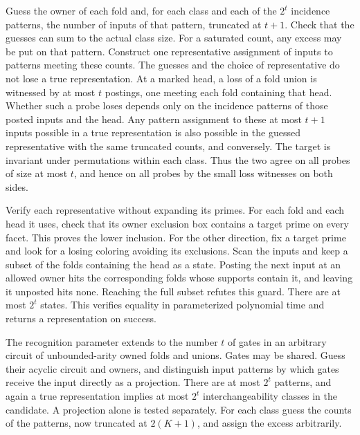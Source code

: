 Guess the owner of each fold and, for each class and each
of the $2^t$ incidence patterns, the number of inputs of
that pattern, truncated at $t+1$. Check that the guesses
can sum to the actual class size. For a saturated count,
any excess may be put on that pattern. Construct one
representative assignment of inputs to patterns meeting
these counts. The guesses and the choice of representative
do not lose a true representation. At a marked head, a
loss of a fold union is witnessed by at most $t$ postings,
one meeting each fold containing that head. Whether such a
probe loses depends only on the incidence patterns of those
posted inputs and the head. Any pattern assignment to
these at most $t+1$ inputs possible in a true representation
is also possible in the guessed representative with the
same truncated counts, and conversely. The target is
invariant under permutations within each class. Thus the
two agree on all probes of size at most $t$, and hence on
all probes by the small loss witnesses on both sides.

Verify each representative without expanding its primes.
For each fold and each head it uses, check that its
owner exclusion box contains a target prime on every
facet. This proves the lower inclusion. For the other
direction, fix a target prime and look for a losing
coloring avoiding its exclusions. Scan the inputs and
keep a subset of the folds containing the head as a
state. Posting the next input at an allowed owner hits
the corresponding folds whose supports contain it, and
leaving it unposted hits none. Reaching the full subset
refutes this guard. There are at most $2^t$ states.
This verifies equality in parameterized polynomial time
and returns a representation on success.

The recognition parameter extends to the number $t$ of
gates in an arbitrary circuit of unbounded-arity owned folds
and unions. Gates may be shared. Guess their acyclic circuit
and owners, and distinguish input patterns by which gates
receive the input directly as a projection. There are at most
$2^t$ patterns, and again a true representation implies at
most $2^t$ interchangeability classes in the candidate.
A projection alone is tested separately. For each class
guess the counts of the patterns, now truncated at $2(K+1)$,
and assign the excess arbitrarily.

